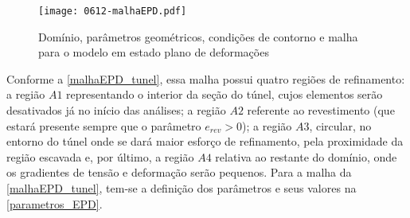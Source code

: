 \begin{figure}[H]
	\begin{center}
		\texttt{[image: 0612-malhaEPD.pdf]}
	\end{center}
	\caption{\label{malhaEPD_tunel}Domínio, parâmetros geométricos, condições de contorno e malha para o modelo em estado plano de deformações}
\end{figure}

Conforme a \autoref{malhaEPD_tunel}, essa malha possui quatro regiões de refinamento: a região $A1$ representando o interior da seção do túnel, cujos elementos serão desativados já no início das análises; a região $A2$ referente ao revestimento (que estará presente sempre que o parâmetro  $e_{rev} > 0$); a região $A3$, circular, no entorno do túnel onde se dará maior esforço de refinamento, pela proximidade da região escavada e, por último, a região $A4$ relativa ao restante do domínio, onde os gradientes de tensão e deformação serão pequenos. Para a malha da \autoref{malhaEPD_tunel}, tem-se a definição dos parâmetros e seus valores na \autoref{parametros_EPD}.

